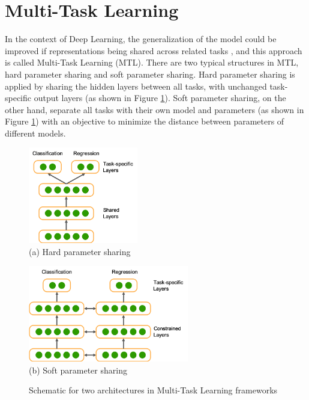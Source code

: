 \section{Multi-Task Learning}

In the context of Deep Learning, the generalization of the model could be improved if representations being shared across related tasks \cite{ruder2017}, and this approach is called Multi-Task Learning (MTL). There are two typical structures in MTL, hard parameter sharing and soft parameter sharing. Hard parameter sharing is applied by sharing the hidden layers between all tasks, with unchanged task-specific output layers (as shown in Figure \ref{fig:mtl}). Soft parameter sharing, on the other hand, separate all tasks with their own model and parameters (as shown in Figure \ref{fig:mtl}) with an objective to minimize the distance between parameters of different models.

\begin{figure}[ht]
    \centering
    \begin{minipage}[c]{0.42\textwidth}
    \centering
    \includegraphics[height=4.2cm]{images/design/multitask_hard.png} \\
    (a) Hard parameter sharing
    \end{minipage}
    \begin{minipage}[c]{0.55\textwidth}
    \centering
    \includegraphics[height=4.2cm]{images/design/multitask_soft.png} \\
    (b) Soft parameter sharing
    \end{minipage}
    \caption{Schematic for two architectures in Multi-Task Learning frameworks}
    \label{fig:mtl}
\end{figure}

